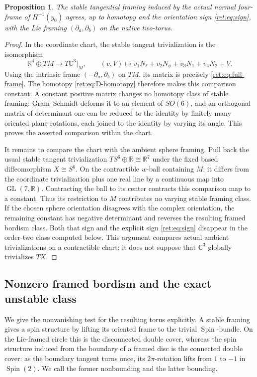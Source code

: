 \documentclass[11pt,letterpaper]{article}
\numberwithin{equation}{section}
\newtheorem{proposition}[theorem]{Proposition}
\theoremstyle{definition}
\theoremstyle{remark}
\begin{document}
\begin{proposition}
The stable tangential framing induced by the actual normal four-frame
of \(H^{-1}(y_0)\) agrees, up to homotopy and the orientation sign
\eqref{ret:eq:sign}, with the Lie framing
\((\partial_a,\partial_b)\) on the native two-torus.
\end{proposition}
\begin{proof}
In the coordinate chart, the stable tangent trivialization is the
isomorphism
\[
 \mathbb R^4\oplus TM\longrightarrow T\mathbb C^3|_M,
 \qquad (v,V)\longmapsto
 v_1N_\ell+v_2N_\phi+v_3N_1+v_4N_2+V.
\]
Using the intrinsic frame \((-\partial_a,\partial_b)\) on \(TM\),
its matrix is precisely \eqref{ret:eq:full-frame}.  The homotopy
\eqref{ret:eq:D-homotopy} therefore makes this comparison constant.
A constant positive matrix changes no homotopy class of stable
framing: Gram--Schmidt deforms it to an element of \(SO(6)\), and
an orthogonal matrix of determinant one can be reduced to the identity
by finitely many oriented plane rotations, each joined to the
identity by varying its angle.  This proves the asserted comparison
within the chart.

It remains to compare the chart with the ambient sphere framing.
Pull back the usual stable tangent trivialization
\(TS^6\oplus\mathbb R\cong\mathbb R^7\) under the fixed based diffeomorphism
\(X\cong S^6\).  On the contractible \(w\)-ball containing \(M\),
it differs from the coordinate trivialization plus one real line by
a continuous map into \(\operatorname{GL}(7,\mathbb R)\).  Contracting the ball to its
center contracts this comparison map to a constant.  Thus its
restriction to \(M\) contributes no varying stable framing class.
If the chosen sphere orientation disagrees with the complex
orientation, the remaining constant has negative determinant and
reverses the resulting framed bordism class.  Both that sign and the
explicit sign \eqref{ret:eq:sign} disappear in the order-two class
computed below.  This argument compares actual ambient
trivializations on a contractible chart; it does not suppose that
\(\mathbb C^3\) globally trivializes \(TX\).
\end{proof}

\subsection{Nonzero framed bordism and the exact unstable class}

We give the nonvanishing test for the resulting torus explicitly.
A stable framing gives a spin structure by lifting its oriented frame
to the trivial \(\operatorname{Spin}\)-bundle.  On the Lie-framed
circle this is the disconnected double cover, whereas the spin
structure induced from the boundary of a framed disc is the
connected double cover: as the boundary tangent turns once, its
\(2\pi\)-rotation lifts from \(1\) to \(-1\) in
\(\operatorname{Spin}(2)\).  We call the former nonbounding and the
latter bounding.
\end{document}
